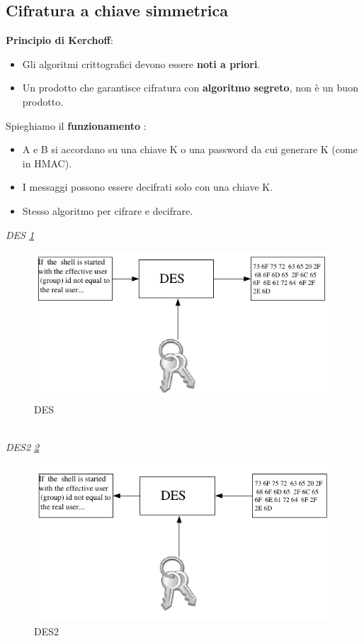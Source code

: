 \documentclass[12pt]{article}
\begin{document}
		\subsection{Cifratura a chiave simmetrica}
			\textbf{Principio di Kerchoff}:
			\begin{itemize}
				\item Gli algoritmi crittografici devono essere \textbf{noti a priori}.
				\item Un prodotto che garantisce cifratura con \textbf{algoritmo segreto}, non è un buon prodotto.
			\end{itemize}
			Spieghiamo il \textbf{funzionamento	}:
			\begin{itemize}
				\item A e B si accordano su una chiave K o una password da cui generare K (come in HMAC).
				\item I messaggi possono essere decifrati solo con una chiave K.
				\item Stesso algoritmo per cifrare e decifrare.					
			\end{itemize}
				
			\textit{DES \ref{fig:14}}\\
			\begin{figure}[h!]
				\centering
				\includegraphics[scale=0.60]{img/des.PNG}
				\caption{DES \label{fig:14}}
			\end{figure}\\
		
			\textit{DES2 \ref{fig:15}}\\
			\begin{figure}[h!]
				\centering
				\includegraphics[scale=0.60]{img/des2.PNG}
				\caption{DES2 \label{fig:15}}
			\end{figure}\\
				
\end{document}
